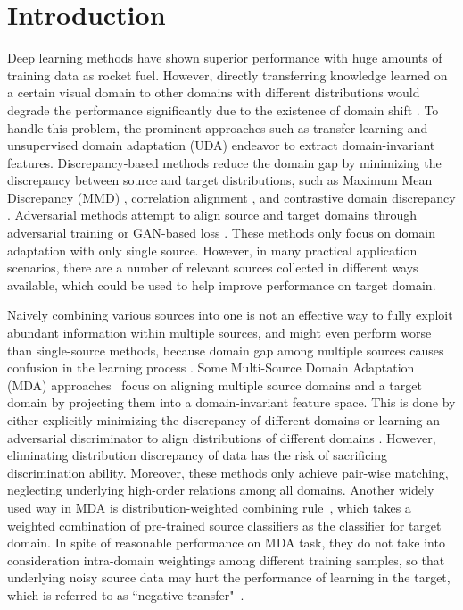 \documentclass[10pt,twocolumn,letterpaper]{article}
\begin{document}
\section{Introduction}
Deep learning methods have shown superior performance with huge amounts of training data as rocket fuel. However, directly transferring knowledge learned on a certain visual domain to other domains with different distributions would degrade the performance significantly due to the existence of domain shift \cite{yosinski2014transferable}. To handle this problem, the prominent approaches such as transfer learning and unsupervised domain adaptation (UDA) endeavor to extract domain-invariant features. Discrepancy-based methods reduce the domain gap by minimizing the discrepancy between source and target distributions, such as Maximum Mean Discrepancy (MMD) \cite{long2015learning}, correlation alignment \cite{sun2017correlation}, and contrastive domain discrepancy \cite{kang2019contrastive}. Adversarial methods attempt to align source and target domains through adversarial training \cite{saito2018maximum,tzeng2017adversarial} or GAN-based loss \cite{hoffman2018cycada,zhu2017unpaired}. These methods only focus on domain adaptation with only single source. However, in many practical application scenarios, there are a number of relevant sources collected in different ways available, which could be used to help improve performance on target domain. \par
Naively combining various sources into one is not an effective way to fully exploit abundant information within multiple sources, and might even perform worse than single-source methods, because domain gap among multiple sources causes confusion in the learning process \cite{zhao2020}. Some Multi-Source Domain Adaptation (MDA) approaches~\cite{xu2018deep,li2018extracting,zhao2020multi,peng2019moment,guo2018multi} focus on aligning multiple source domains and a target domain by projecting them into a domain-invariant feature space. This is done by either explicitly minimizing the discrepancy of different domains \cite{guo2018multi,hoffman2018algorithms,peng2019moment} or learning an adversarial discriminator to align distributions of different domains \cite{xu2018deep,zhao2018adversarial,li2018extracting}. However, eliminating distribution discrepancy of data has the risk of sacrificing discrimination ability. Moreover, these methods only achieve pair-wise matching, neglecting underlying high-order relations among all domains. Another widely used way in MDA is distribution-weighted combining rule~\cite{hoffman2018algorithms,zhao2018adversarial, li2018extracting}, which takes a weighted combination of pre-trained source classifiers as the classifier for target domain. In spite of reasonable performance on MDA task, they do not take into consideration intra-domain weightings among different training samples, so that underlying noisy source data may hurt the performance of learning in the target, which is referred to as ``negative transfer"~\cite{pan2009survey}.\par
\end{document}
